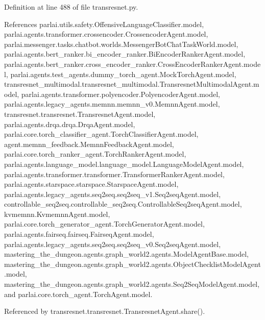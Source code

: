Definition at line 488 of file transresnet.\+py.



References parlai.\+utils.\+safety.\+Offensive\+Language\+Classifier.\+model, parlai.\+agents.\+transformer.\+crossencoder.\+Crossencoder\+Agent.\+model, parlai.\+messenger.\+tasks.\+chatbot.\+worlds.\+Messenger\+Bot\+Chat\+Task\+World.\+model, parlai.\+agents.\+bert\+\_\+ranker.\+bi\+\_\+encoder\+\_\+ranker.\+Bi\+Encoder\+Ranker\+Agent.\+model, parlai.\+agents.\+bert\+\_\+ranker.\+cross\+\_\+encoder\+\_\+ranker.\+Cross\+Encoder\+Ranker\+Agent.\+model, parlai.\+agents.\+test\+\_\+agents.\+dummy\+\_\+torch\+\_\+agent.\+Mock\+Torch\+Agent.\+model, transresnet\+\_\+multimodal.\+transresnet\+\_\+multimodal.\+Transresnet\+Multimodal\+Agent.\+model, parlai.\+agents.\+transformer.\+polyencoder.\+Polyencoder\+Agent.\+model, parlai.\+agents.\+legacy\+\_\+agents.\+memnn.\+memnn\+\_\+v0.\+Memnn\+Agent.\+model, transresnet.\+transresnet.\+Transresnet\+Agent.\+model, parlai.\+agents.\+drqa.\+drqa.\+Drqa\+Agent.\+model, parlai.\+core.\+torch\+\_\+classifier\+\_\+agent.\+Torch\+Classifier\+Agent.\+model, agent.\+memnn\+\_\+feedback.\+Memnn\+Feedback\+Agent.\+model, parlai.\+core.\+torch\+\_\+ranker\+\_\+agent.\+Torch\+Ranker\+Agent.\+model, parlai.\+agents.\+language\+\_\+model.\+language\+\_\+model.\+Language\+Model\+Agent.\+model, parlai.\+agents.\+transformer.\+transformer.\+Transformer\+Ranker\+Agent.\+model, parlai.\+agents.\+starspace.\+starspace.\+Starspace\+Agent.\+model, parlai.\+agents.\+legacy\+\_\+agents.\+seq2seq.\+seq2seq\+\_\+v1.\+Seq2seq\+Agent.\+model, controllable\+\_\+seq2seq.\+controllable\+\_\+seq2seq.\+Controllable\+Seq2seq\+Agent.\+model, kvmemnn.\+Kvmemnn\+Agent.\+model, parlai.\+core.\+torch\+\_\+generator\+\_\+agent.\+Torch\+Generator\+Agent.\+model, parlai.\+agents.\+fairseq.\+fairseq.\+Fairseq\+Agent.\+model, parlai.\+agents.\+legacy\+\_\+agents.\+seq2seq.\+seq2seq\+\_\+v0.\+Seq2seq\+Agent.\+model, mastering\+\_\+the\+\_\+dungeon.\+agents.\+graph\+\_\+world2.\+agents.\+Model\+Agent\+Base.\+model, mastering\+\_\+the\+\_\+dungeon.\+agents.\+graph\+\_\+world2.\+agents.\+Object\+Checklist\+Model\+Agent.\+model, mastering\+\_\+the\+\_\+dungeon.\+agents.\+graph\+\_\+world2.\+agents.\+Seq2\+Seq\+Model\+Agent.\+model, and parlai.\+core.\+torch\+\_\+agent.\+Torch\+Agent.\+model.



Referenced by transresnet.\+transresnet.\+Transresnet\+Agent.\+share().

